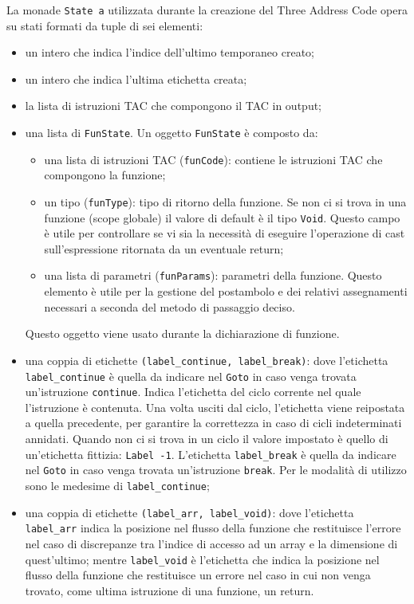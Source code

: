 La monade {\tt State a} utilizzata durante la creazione del Three Address Code opera su stati formati da tuple di sei elementi:
\begin{itemize}
    \item un intero che indica l'indice dell'ultimo temporaneo creato;
    \item un intero che indica l'ultima etichetta creata;
    \item la lista di istruzioni TAC che compongono il TAC in output;
    \item una lista di {\tt FunState}. Un oggetto {\tt FunState} è composto da:
    \begin{itemize}
        \item una lista di istruzioni TAC ({\tt funCode}): contiene le istruzioni TAC che compongono la funzione;
        \item un tipo ({\tt funType}): tipo di ritorno della funzione. Se non ci si trova in una funzione (scope globale) il valore di default è il tipo {\tt Void}. Questo campo è utile per controllare se vi sia la necessità di eseguire l'operazione di cast sull'espressione ritornata da un eventuale return;
        \item una lista di parametri ({\tt funParams}): parametri della funzione. Questo elemento è utile per la gestione del postambolo e dei relativi assegnamenti necessari a seconda del metodo di passaggio deciso.
    \end{itemize}
    Questo oggetto viene usato durante la dichiarazione di funzione.
    \item una coppia di etichette {\tt (label\_continue, label\_break)}: dove l'etichetta {\tt label\_continue} è quella da indicare nel {\tt Goto} in caso venga trovata un'istruzione {\tt continue}. Indica l'etichetta del ciclo corrente nel quale l'istruzione è contenuta. Una volta usciti dal ciclo, l'etichetta viene reipostata a quella precedente, per garantire la correttezza in caso di cicli indeterminati annidati. Quando non ci si trova in un ciclo il valore impostato è quello di un'etichetta fittizia: {\tt Label -1}. L'etichetta {\tt label\_break} è quella da indicare nel {\tt Goto} in caso venga trovata un'istruzione {\tt break}. Per le modalità di utilizzo sono le medesime di {\tt label\_continue};
    \item una coppia di etichette {\tt (label\_arr, label\_void)}: dove l'etichetta {\tt label\_arr} indica la posizione nel flusso della funzione che restituisce l'errore nel caso di discrepanze tra l'indice di accesso ad un array e la dimensione di quest'ultimo; mentre {\tt label\_void} è l'etichetta che indica la posizione nel flusso della funzione che restituisce un errore nel caso in cui non venga trovato, come ultima istruzione di una funzione, un return.
\end{itemize}

